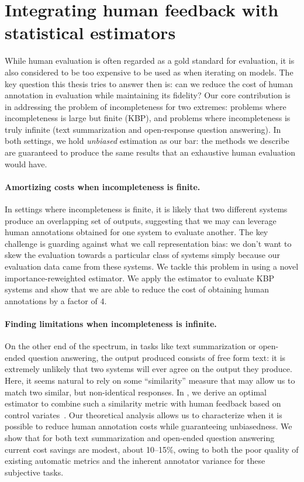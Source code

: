 \section{Integrating human feedback with statistical estimators}
While human evaluation is often regarded as a gold standard for evaluation, it is also considered to be too expensive to be used as when iterating on models.
The key question this thesis tries to answer then is: can we reduce the cost of human annotation in evaluation while maintaining its fidelity?
Our core contribution is in addressing the problem of incompleteness for two extremes: problems where incompleteness is large but finite (KBP), and problems where incompleteness is truly infinite (text summarization and open-response question answering).
In both settings, we hold \textit{unbiased} estimation as our bar: the methods we describe are guaranteed to produce the same results that an exhaustive human evaluation would have.

\paragraph{Amortizing costs when incompleteness is finite.}
In settings where incompleteness is finite, it is likely that two different systems produce an overlapping set of outputs, suggesting that we may can leverage human annotations obtained for one system to evaluate another.
The key challenge is guarding against what we call representation bias: we don't want to skew the evaluation towards a particular class of systems simply because our evaluation data came from these systems.
We tackle this problem in  using a novel importance-reweighted estimator. We apply the estimator to evaluate KBP systems and show that we are able to reduce the cost of obtaining human annotations by a factor of 4.

\paragraph{Finding limitations when incompleteness is infinite.}
On the other end of the spectrum, in tasks like text summarization or open-ended question answering, the output produced consists of free form text: it  is extremely unlikely that two systems will ever agree on the output they produce.
Here, it seems natural to rely on some ``similarity'' measure that may allow us to match two similar, but non-identical responses.
In , we derive an optimal estimator to combine such a similarity metric with human feedback based on control variates~\citep{owen2013monte}.
Our theoretical analysis allows us to characterize when it is possible to reduce human annotation costs while guaranteeing unbiasedness.
We show that for both text summarization and open-ended question answering current cost savings are modest, about 10--15\%, owing to both the poor quality of existing automatic metrics and the inherent annotator variance for these subjective tasks.

